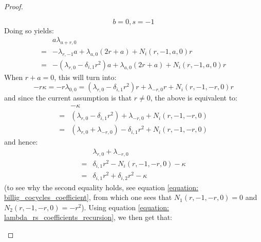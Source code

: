 \begin{proof}
\begin{itemize}
                        $$b = 0, s = -1$$
                    Doing so yields:
                        $$
                            \begin{aligned}
                                & a \lambda_{a + r, 0}
                                \\
                                = & -\lambda_{r, -1} a + \lambda_{a, 0} \left( 2r + a \right) + N_i(r, -1, a, 0) r
                                \\
                                = & -(\lambda_{r, 0} - \delta_{i, 1} r^2) a + \lambda_{a, 0} \left( 2r + a \right) + N_i(r, -1, a, 0) r
                            \end{aligned}
                        $$
                    When $r + a = 0$, this will turn into:
                        $$-r \kappa = -r \lambda_{0, 0} = (\lambda_{r, 0} - \delta_{i, 1} r^2) r + \lambda_{-r, 0} r + N_i(r, -1, -r, 0) r$$
                    and since the current assumption is that $r \not = 0$, the above is equivalent to:
                        $$
                            \begin{aligned}
                                & -\kappa
                                \\
                                = & (\lambda_{r, 0} - \delta_{i, 1} r^2) + \lambda_{-r, 0} + N_i(r, -1, -r, 0)
                                \\
                                = & (\lambda_{r, 0} + \lambda_{-r, 0}) - \delta_{i, 1} r^2 + N_i(r, -1, -r, 0)
                            \end{aligned}
                        $$
                    and hence:
                        $$
                            \begin{aligned}
                                & \lambda_{r, 0} + \lambda_{-r, 0}
                                \\
                                = & \delta_{i, 1} r^2 - N_i(r, -1, -r, 0) - \kappa
                                \\
                                = & \delta_{i, 1} r^2 + \delta_{i, 2} r^2 - \kappa
                            \end{aligned}
                        $$
                    (to see why the second equality holds, see equation \eqref{equation: billig_cocycles_coefficient}, from which one sees that $N_1(r, -1, -r, 0) = 0$ and $N_2(r, -1, -r, 0) = -r^2$). Using equation \eqref{equation: lambda_rs_coefficients_recursion}, we then get that:

\end{itemize}
\end{proof}
